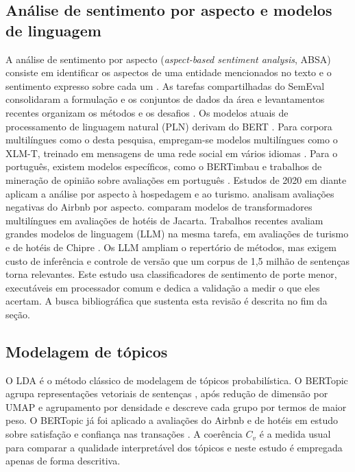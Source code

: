 \subsection{Análise de sentimento por aspecto e modelos de linguagem}

A análise de sentimento por aspecto (\textit{aspect-based sentiment analysis}, ABSA) consiste em identificar os aspectos de uma entidade mencionados no texto e o sentimento expresso sobre cada um \citep{liu2012}. As tarefas compartilhadas do SemEval consolidaram a formulação e os conjuntos de dados da área \citep{pontiki2014,pontiki2016} e levantamentos recentes organizam os métodos e os desafios \citep{schouten2016,zhang2023absa}. Os modelos atuais de processamento de linguagem natural (PLN) derivam do BERT \citep{devlin2019}. Para corpora multilíngues como o desta pesquisa, empregam-se modelos multilíngues como o XLM-T, treinado em mensagens de uma rede social em vários idiomas \citep{barbieri2022}. Para o português, existem modelos específicos, como o BERTimbau \citep{souza2020} e trabalhos de mineração de opinião sobre avaliações em português \citep{freitas2013}. Estudos de 2020 em diante aplicam a análise por aspecto à hospedagem e ao turismo. \citet{vassilikopoulou2022} analisam avaliações negativas do Airbnb por aspecto. \citet{suryabrata2026} comparam modelos de transformadores multilíngues em avaliações de hotéis de Jacarta. Trabalhos recentes avaliam grandes modelos de linguagem (LLM) na mesma tarefa, em avaliações de turismo \citep{xu2026} e de hotéis de Chipre \citep{giritli2026}. Os LLM ampliam o repertório de métodos, mas exigem custo de inferência e controle de versão que um corpus de 1,5 milhão de sentenças torna relevantes. Este estudo usa classificadores de sentimento de porte menor, executáveis em processador comum e dedica a validação a medir o que eles acertam. A busca bibliográfica que sustenta esta revisão é descrita no fim da seção.

\subsection{Modelagem de tópicos}

O LDA \citep{blei2003} é o método clássico de modelagem de tópicos probabilística. O BERTopic \citep{grootendorst2022} agrupa representações vetoriais de sentenças \citep{reimers2019,reimers2020}, após redução de dimensão por UMAP \citep{mcinnes2018umap} e agrupamento por densidade \citep{mcinnes2017} e descreve cada grupo por termos de maior peso. O BERTopic já foi aplicado a avaliações do Airbnb e de hotéis em estudo sobre satisfação e confiança nas transações \citep{reymoreno2023}. A coerência $C_v$ \citep{roder2015} é a medida usual para comparar a qualidade interpretável dos tópicos e neste estudo é empregada apenas de forma descritiva.

